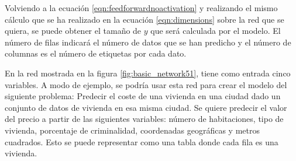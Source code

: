 Volviendo a la ecuación \ref{eqn:feedforwardnoactivation} y realizando el mismo cálculo que se ha realizado en la ecuación \ref{eqn:dimensions} sobre la red que se quiera, se puede obtener el tamaño de $y$ que será calculada por el modelo. El número de filas indicará el número de datos que se han predicho y el número de columnas es el número de etiquetas por cada dato.
\newline

En la red mostrada en la figura \ref{fig:basic_network51}, tiene como entrada cinco variables. A modo de ejemplo, se podría usar esta red para crear el modelo del siguiente problema: Predecir el coste de una vivienda en una ciudad dado un conjunto de datos de vivienda en esa misma ciudad. Se quiere predecir el valor del precio a partir de las siguientes variables: número de habitaciones, tipo de vivienda, porcentaje de criminalidad, coordenadas geográficas y metros cuadrados. Esto se puede representar como una tabla donde cada fila es una vivienda.
\newline


